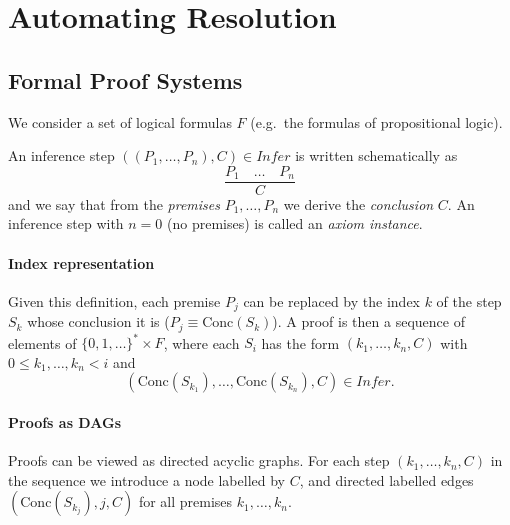% 
\chapter{Automating Resolution}
\section{Formal Proof Systems} 
We consider a set of logical formulas $F$ (e.g.\ the formulas of propositional logic).
 
 
An inference step $((P_1, \ldots, P_n), C) \in \mathit{Infer}$ is written schematically as
\[
\frac{P_1 \quad \ldots \quad P_n}{C}
\]
and we say that from the \emph{premises} $P_1, \ldots, P_n$ we derive the \emph{conclusion} $C$. An inference step with $n = 0$ (no premises) is called an \emph{axiom instance}.
 
 
\subsubsection*{Index representation}
 
Given this definition, each premise $P_j$ can be replaced by the index $k$ of the step $S_k$ whose conclusion it is ($P_j \equiv \mathrm{Conc}(S_k)$). A proof is then a sequence of elements of $\{0, 1, \ldots\}^* \times F$, where each $S_i$ has the form $(k_1, \ldots, k_n, C)$ with $0 \le k_1, \ldots, k_n < i$ and
\[
(\mathrm{Conc}(S_{k_1}), \ldots, \mathrm{Conc}(S_{k_n}), C) \in \mathit{Infer}.
\]
 
\subsubsection*{Proofs as DAGs}
 
Proofs can be viewed as directed acyclic graphs. For each step $(k_1, \ldots, k_n, C)$ in the sequence we introduce a node labelled by $C$, and directed labelled edges $(\mathrm{Conc}(S_{k_j}), j, C)$ for all premises $k_1, \ldots, k_n$.
 
